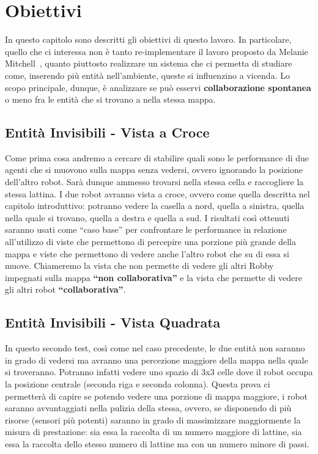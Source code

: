 \chapter{Obiettivi}
In questo capitolo sono descritti gli obiettivi di questo lavoro. In
particolare, quello che ci interessa non è tanto re-implementare il lavoro
proposto da Melanie Mitchell~\cite{biblio:robby}, quanto piuttosto realizzare un
sistema che ci permetta di studiare come, inserendo più entità nell'ambiente,
queste si influenzino a vicenda.\newline
Lo scopo principale, dunque, è analizzare se può esservi \textbf{collaborazione
spontanea} o meno fra le entità che si trovano a nella stessa mappa.



\section{Entità Invisibili - Vista a Croce}
Come prima cosa andremo a cercare di stabilire quali sono le performance di due
agenti che si muovono sulla mappa senza vedersi, ovvero ignorando la posizione
dell'altro robot. Sarà dunque ammesso trovarsi nella stessa cella e raccogliere
la stessa lattina.\newline
I due robot avranno vista a croce, ovvero come quella descritta nel capitolo
introduttivo: potranno vedere la casella a nord, quella a sinistra, quella nella
quale si trovano, quella a destra e quella a sud.\newline
I risultati così ottenuti saranno usati come ``caso base'' per confrontare le
performance in relazione all'utilizzo di viste che permettono di percepire una
porzione più grande della mappa e viste che permettono di vedere anche l'altro
robot che su di essa si muove.\newline
Chiameremo la vista che non permette di vedere gli altri Robby impegnati sulla
mappa \textbf{``non collaborativa''} e la vista che permette di vedere gli altri
robot \textbf{``collaborativa''}.



\section{Entità Invisibili - Vista Quadrata}
In questo secondo test, così come nel caso precedente, le due entità non saranno
in grado di vedersi ma avranno una percezione maggiore della mappa nella quale
si troveranno. Potranno infatti vedere uno spazio di 3x3 celle dove il robot
occupa la posizione centrale (seconda riga e seconda colonna).\newline
Questa prova ci permetterà di capire se potendo vedere una porzione di mappa
maggiore, i robot saranno avvantaggiati nella pulizia della stessa, ovvero, se
disponendo di più risorse (sensori più potenti) saranno in grado di massimizzare
maggiormente la misura di prestazione: sia essa la raccolta di un numero
maggiore di lattine, sia essa la raccolta dello stesso numero di lattine ma con
un numero minore di passi.



